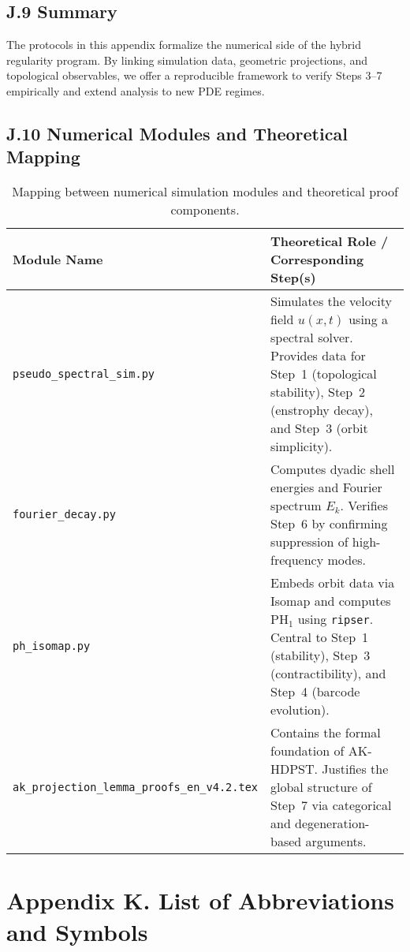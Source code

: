 \documentclass[11pt]{article}
\theoremstyle{definition}
\begin{document}
\subsection*{J.9 Summary}
The protocols in this appendix formalize the numerical side of the hybrid regularity program. By linking simulation data, geometric projections, and topological observables, we offer a reproducible framework to verify Steps 3--7 empirically and extend analysis to new PDE regimes.

\subsection*{J.10 Numerical Modules and Theoretical Mapping}
\label{subsec:J10}

\begin{table}[h!]
\centering
\renewcommand{\arraystretch}{1.4}
\begin{tabular}{|p{4.5cm}|p{8.5cm}|}
\hline
\textbf{Module Name} & \textbf{Theoretical Role / Corresponding Step(s)} \\
\hline
\texttt{pseudo\_spectral\_sim.py} &
Simulates the velocity field $u(x,t)$ using a spectral solver. Provides data for Step~1 (topological stability), Step~2 (enstrophy decay), and Step~3 (orbit simplicity). \\
\hline
\texttt{fourier\_decay.py} &
Computes dyadic shell energies and Fourier spectrum $E_k$. Verifies Step~6 by confirming suppression of high-frequency modes. \\
\hline
\texttt{ph\_isomap.py} &
Embeds orbit data via Isomap and computes $\mathrm{PH}_1$ using \texttt{ripser}. Central to Step~1 (stability), Step~3 (contractibility), and Step~4 (barcode evolution). \\
\hline
\texttt{ak\_projection\_lemma\_proofs\_en\_v4.2.tex} &
Contains the formal foundation of AK-HDPST. Justifies the global structure of Step~7 via categorical and degeneration-based arguments. \\
\hline
\end{tabular}
\caption{Mapping between numerical simulation modules and theoretical proof components.}
\label{tab:numerical_mapping}
\end{table}


\section*{Appendix K. List of Abbreviations and Symbols}
\end{document}
